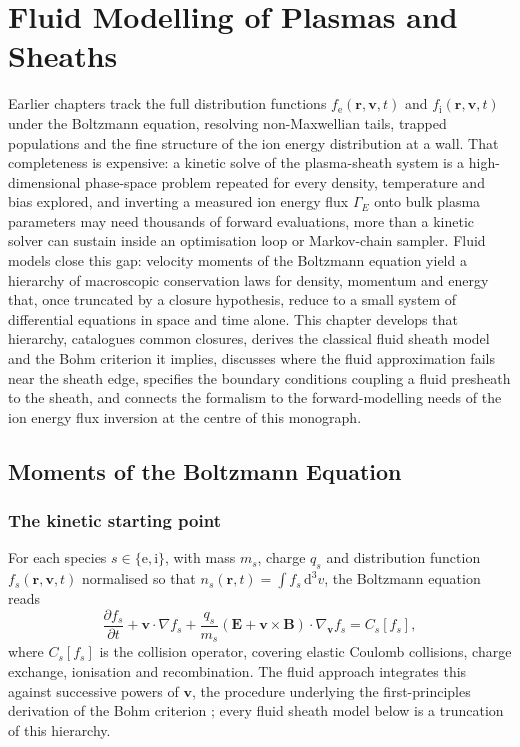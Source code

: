 \chapter{Fluid Modelling of Plasmas and Sheaths}
\label{ch:fluid}

Earlier chapters track the full distribution functions $f_{\mathrm{e}}(\mathbf{r},\mathbf{v},t)$ and $f_{\mathrm{i}}(\mathbf{r},\mathbf{v},t)$ under the Boltzmann equation, resolving non-Maxwellian tails, trapped populations and the fine structure of the ion energy distribution at a wall. That completeness is expensive: a kinetic solve of the plasma-sheath system is a high-dimensional phase-space problem repeated for every density, temperature and bias explored, and inverting a measured ion energy flux $\Gamma_{E}$ onto bulk plasma parameters may need thousands of forward evaluations, more than a kinetic solver can sustain inside an optimisation loop or Markov-chain sampler. Fluid models close this gap: velocity moments of the Boltzmann equation yield a hierarchy of macroscopic conservation laws for density, momentum and energy that, once truncated by a closure hypothesis, reduce to a small system of differential equations in space and time alone. This chapter develops that hierarchy, catalogues common closures, derives the classical fluid sheath model and the Bohm criterion it implies, discusses where the fluid approximation fails near the sheath edge, specifies the boundary conditions coupling a fluid presheath to the sheath, and connects the formalism to the forward-modelling needs of the ion energy flux inversion at the centre of this monograph.

\section{Moments of the Boltzmann Equation}
\label{sec:moments}

\subsection{The kinetic starting point}

For each species $s\in\{\mathrm{e},\mathrm{i}\}$, with mass $m_s$, charge $q_s$ and distribution function $f_s(\mathbf{r},\mathbf{v},t)$ normalised so that $n_s(\mathbf{r},t)=\int f_s\,\mathrm{d}^3v$, the Boltzmann equation reads
\begin{equation}
\frac{\partial f_s}{\partial t} + \mathbf{v}\cdot\nabla f_s + \frac{q_s}{m_s}\left(\mathbf{E}+\mathbf{v}\times\mathbf{B}\right)\cdot\nabla_{\mathbf{v}} f_s = C_s[f_s],
\label{ch12-eq:boltzmann}
\end{equation}
where $C_s[f_s]$ is the collision operator, covering elastic Coulomb collisions, charge exchange, ionisation and recombination. The fluid approach integrates this against successive powers of $\mathbf{v}$, the procedure underlying the first-principles derivation of the Bohm criterion \cite{ref0670}; every fluid sheath model below is a truncation of this hierarchy.

